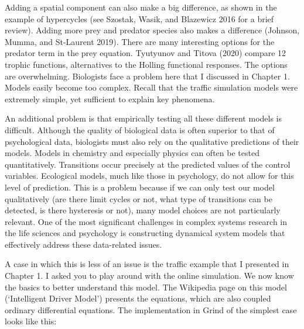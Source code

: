 \documentclass[
  letterpaper,
]{scrbook}
\begin{document}
Adding a spatial component can also make a big difference, as shown in
the example of hypercycles (see Szostak, Wasik, and Blazewicz 2016 for a
brief review). Adding more prey and predator species also makes a
difference (Johnson, Mumma, and St-Laurent 2019). There are many
interesting options for the predator term in the prey equation.
Tyutyunov and Titova (2020) compare 12 trophic functions, alternatives
to the Holling functional responses. The options are overwhelming.
Biologists face a problem here that I discussed in Chapter 1. Models
easily become too complex. Recall that the traffic simulation models
were extremely simple, yet sufficient to explain key phenomena.

An additional problem is that empirically testing all these different
models is difficult. Although the quality of biological data is often
superior to that of psychological data, biologists must also rely on the
qualitative predictions of their models. Models in chemistry and
especially physics can often be tested quantitatively. Transitions occur
precisely at the predicted values of the control variables. Ecological
models, much like those in psychology, do not allow for this level of
prediction. This is a problem because if we can only test our model
qualitatively (are there limit cycles or not, what type of transitions
can be detected, is there hysteresis or not), many model choices are not
particularly relevant. One of the most significant challenges in complex
systems research in the life sciences and psychology is constructing
dynamical system models that effectively address these data-related
issues.

A case in which this is less of an issue is the traffic example that I
presented in Chapter 1. I asked you to play around with the online
simulation. We now know the basics to better understand this model. The
Wikipedia page on this model (`Intelligent Driver Model') presents the
equations, which are also coupled ordinary differential equations. The
implementation in Grind of the simplest case looks like this:
\end{document}
